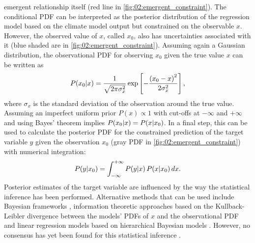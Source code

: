 emergent relationship itself (red line in \cref{fig:02:emergent_constraint}).
The conditional \ac{PDF} can be interpreted as the posterior distribution of
the regression model based on the climate model output but constrained on the
observable $x$. However, the observed value of $x$, called $x_0$, also has
uncertainties associated with it (blue shaded are in
\cref{fig:02:emergent_constraint}). Assuming again a Gaussian distribution, the
observational \ac{PDF} for observing $x_0$ given the true value $x$ can be
written as
\begin{equation}
  P(x_0|x) = \frac{1}{\sqrt{2 \pi \sigma_x^2}} \exp \left[ -\frac{\left(
    x_0 - x \right)^2}{2 \sigma_x^2} \right],
  \label{eq:02:pdf_obs}
\end{equation}
where $\sigma_x$ is the standard deviation of the observation around the true
value. Assuming an imperfect uniform prior $P(x) \propto 1$ with cut-offs at
$-\infty$ and $+\infty$ and using Bayes' theorem implies $P(x_0|x) =
P(x|x_0)$. In a final step, this can be used to calculate the posterior
\ac{PDF} for the constrained prediction of the target variable $y$ given the
observation $x_0$ (gray \ac{PDF} in \cref{fig:02:emergent_constraint}) with
numerical integration:
\begin{equation}
  P(y|x_0) = \int_{-\infty}^{+\infty} P(y|x) \, P(x|x_0) \, d{}x.
  \label{eq:02:pdf_y_given_x0}
\end{equation}
Posterior estimates of the target variable are influenced by the way the
statistical inference has been performed. Alternative methods that can be used
include Bayesian frameworks \autocite{Renoult2020}, information theoretic
approaches based on the Kullback-Leibler divergence between the models'
\acp{PDF} of $x$ and the observational \ac{PDF} \autocite{Brient2016} and
linear regression models based on hierarchical Bayesian models
\autocite{Nijsse2020}. However, no consensus has yet been found for this
statistical inference \autocite{Brient2020}.

